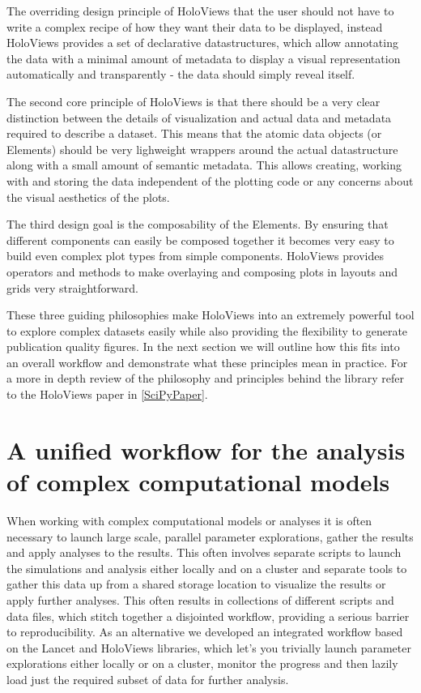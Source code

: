 The overriding design principle of HoloViews that the user should not
have to write a complex recipe of how they want their data to be
displayed, instead HoloViews provides a set of declarative
datastructures, which allow annotating the data with a minimal amount
of metadata to display a visual representation automatically and
transparently - the data should simply reveal itself.

The second core principle of HoloViews is that there should be a very
clear distinction between the details of visualization and actual data
and metadata required to describe a dataset. This means that the
atomic data objects (or Elements) should be very lighweight wrappers
around the actual datastructure along with a small amount of semantic
metadata. This allows creating, working with and storing the data
independent of the plotting code or any concerns about the visual
aesthetics of the plots.

The third design goal is the composability of the Elements. By
ensuring that different components can easily be composed together it
becomes very easy to build even complex plot types from simple
components. HoloViews provides operators and methods to make
overlaying and composing plots in layouts and grids very
straightforward.

These three guiding philosophies make HoloViews into an extremely
powerful tool to explore complex datasets easily while also providing
the flexibility to generate publication quality figures. In the next
section we will outline how this fits into an overall workflow and
demonstrate what these principles mean in practice. For a more in
depth review of the philosophy and principles behind the library refer
to the HoloViews paper in \ref{SciPyPaper}.


\section{A unified workflow for the analysis of complex computational models}

When working with complex computational models or analyses it is often
necessary to launch large scale, parallel parameter explorations,
gather the results and apply analyses to the results. This often
involves separate scripts to launch the simulations and analysis
either locally and on a cluster and separate tools to gather this data
up from a shared storage location to visualize the results or apply
further analyses. This often results in collections of different
scripts and data files, which stitch together a disjointed workflow,
providing a serious barrier to reproducibility. As an alternative we
developed an integrated workflow based on the Lancet and HoloViews
libraries, which let's you trivially launch parameter explorations
either locally or on a cluster, monitor the progress and then lazily
load just the required subset of data for further analysis.

